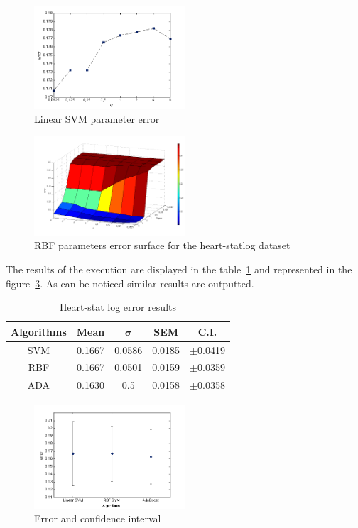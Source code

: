 \documentclass[10pt, journal]{IEEEtran}
\begin{document}
\begin{figure}[ht!]
	\centering
	\includegraphics[width=0.5\textwidth]{img/errorSVMHeartLog}
	\caption{Linear SVM parameter error}
	\label{fig:errorSVMHeartLog}
\end{figure}
\begin{figure}[ht!]
	\centering
	\includegraphics[width=0.5\textwidth]{img/errorSurfaceHeartStatLog}
	\caption{RBF parameters error surface for the heart-statlog dataset}
	\label{fig:errorSurfaceHeartStatLog}
\end{figure}

The results of the execution are displayed in the table~\ref{tab:heartErrorComparison} and represented in the figure~\ref{fig:heartLogAnalisy}. As can be noticed similar results are outputted.\\
\begin{table}[ht!]
	\centering
	\begin{tabular}{|c|c|c|c|c|}
		\hline
		\textbf{Algorithms} & \textbf{Mean} & $\mathbf{\sigma}$ & \textbf{SEM} & \textbf{C.I.}\\\hline
		SVM & 0.1667 & 0.0586 & 0.0185 & $\pm$0.0419\\\hline
		RBF & 0.1667 & 0.0501 & 0.0159 & $\pm$0.0359\\\hline
		ADA & 0.1630 & 0.5 & 0.0158 & $\pm$0.0358\\\hline
	\end{tabular}
	\label{tab:heartErrorComparison}
	\caption{Heart-stat log error results}
\end{table}
\begin{figure}[ht!]
	\centering
	\includegraphics[width=0.5\textwidth]{img/heartLogAnalisy}
	\caption{Error and confidence interval}
	\label{fig:heartLogAnalisy}
\end{figure}
\end{document}
